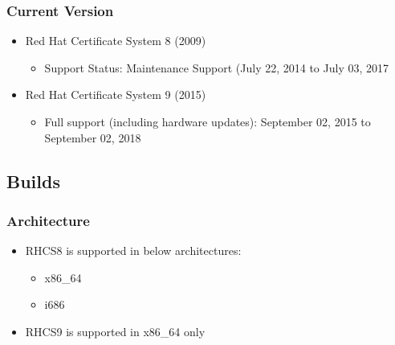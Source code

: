 \documentclass[a4paper]{article}
\begin{document}
    \subsubsection{Current Version}
        \begin{itemize}
            \item Red Hat Certificate System 8 (2009) 
                \begin{itemize}
                    \item Support Status: Maintenance Support (July 22, 2014 to July 03, 2017
                \end{itemize}
            \item Red Hat Certificate System 9 (2015)
                \begin{itemize}
                    \item Full support (including hardware updates): September 02, 2015 to September 02, 2018
                \end{itemize}
        \end{itemize}
\subsection{Builds}
    \subsubsection{Architecture}
        \begin{itemize}
            \item RHCS8 is supported in below architectures:
                \begin{itemize}
                    \item x86\_64
                    \item i686
                \end{itemize}
            \item RHCS9 is supported in x86\_64 only
        \end{itemize}
\end{document}
